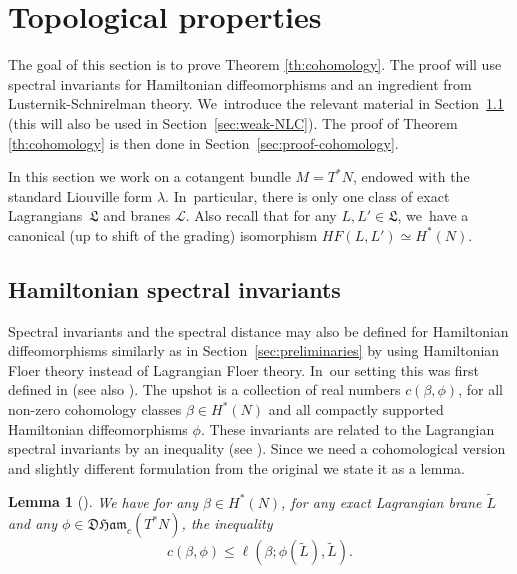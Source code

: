 \documentclass[10pt]{amsart}
\newtheorem{lem}[thm]{Lemma}
\theoremstyle{definition}
\newcommand {\LL}{{\mathcal L}}
\newcommand{\DHam}{\mathfrak{DHam}}
\newcommand{\fL}{\mathfrak {L}}
\begin{document}
\section{Topological properties}\label{sec:topological-properties}

The goal of this section is to prove Theorem \ref{th:cohomology}. The proof will use spectral invariants for Hamiltonian diffeomorphisms and an ingredient from Lusternik-Schnirelman theory. We~introduce the relevant material in Section~\ref{sec:Hamiltonian-spectral-invariants} (this will also be used in Section~\ref{sec:weak-NLC}). The proof of Theorem \ref{th:cohomology} is then done in Section~\ref{sec:proof-cohomology}.

In this section we work on a cotangent bundle $M=T^*N$, endowed with the standard Liouville form $\lambda$. In~particular, there is only one class of exact Lagrangians~$\fL$ and branes $\LL$. Also recall that for any $L, L'\in\fL$, we~have a canonical (up to shift of the grading) isomorphism $HF(L,L')\simeq H^*(N)$.

\subsection{Hamiltonian spectral invariants}\label{sec:Hamiltonian-spectral-invariants}

Spectral invariants and the spectral distance may also be defined for Hamiltonian diffeomorphisms similarly as in Section~\ref{sec:preliminaries} by using Hamiltonian Floer theory instead of Lagrangian Floer theory. In~our setting this was first defined in \cite{Frauenfelder-Schlenk} (see also \cite{Lanzat}). The upshot is a collection of real numbers $c(\beta, \phi)$, for all non-zero cohomology classes $\beta\in H^*(N)$ and all compactly supported Hamiltonian diffeomorphisms $\phi$. These invariants are related to the Lagrangian spectral invariants by an inequality (see \cite[Prop.\,2.14]{M-V-Z}). Since we need a cohomological version and slightly different formulation from the original we state it as a lemma.

\begin{lem}[\cite{M-V-Z}]
We have for any $\beta \in H^*(N)$, for any exact Lagrangian brane $\tilde L$ and any $\phi\in\DHam_c(T^*N)$, the inequality
\begin{equation}\label{eq:Lagrangian-Hamiltonian-spectral-invariants}
c(\beta, \phi)\leq \ell(\beta;\phi(\tilde L), \tilde L).
\end{equation}
\end{lem}
\end{document}
